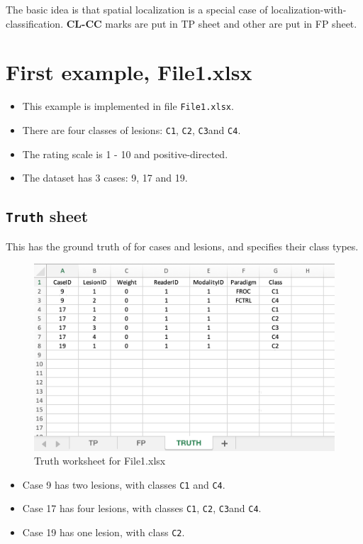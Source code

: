 \documentclass[
]{book}
\providecommand{\tightlist}{%
  \setlength{\itemsep}{0pt}\setlength{\parskip}{0pt}}
\begin{document}
The basic idea is that spatial localization is a special case of localization-with-classification. \textbf{CL-CC} marks are put in TP sheet and other are put in FP sheet.

\hypertarget{classification-tasks-example1}{%
\section{First example, File1.xlsx}\label{classification-tasks-example1}}

\begin{itemize}
\tightlist
\item
  This example is implemented in file \texttt{File1.xlsx}.
\item
  There are four classes of lesions: \texttt{C1}, \texttt{C2}, \texttt{C3}and \texttt{C4}.
\item
  The rating scale is 1 - 10 and positive-directed.
\item
  The dataset has 3 cases: 9, 17 and 19.
\end{itemize}

\hypertarget{classification-tasks-example1-truth}{%
\subsection{\texorpdfstring{\texttt{Truth} sheet}{Truth sheet}}\label{classification-tasks-example1-truth}}

This has the ground truth of for cases and lesions, and specifies their class types.

\begin{figure}

{\centering \includegraphics[width=0.5\linewidth,height=0.2\textheight]{images/classification/File1Truth} 

}

\caption{Truth worksheet for File1.xlsx}\label{fig:File1Truth}
\end{figure}

\begin{itemize}
\tightlist
\item
  Case 9 has two lesions, with classes \texttt{C1} and \texttt{C4}.
\item
  Case 17 has four lesions, with classes \texttt{C1}, \texttt{C2}, \texttt{C3}and \texttt{C4}.
\item
  Case 19 has one lesion, with class \texttt{C2}.
\end{itemize}
\end{document}

